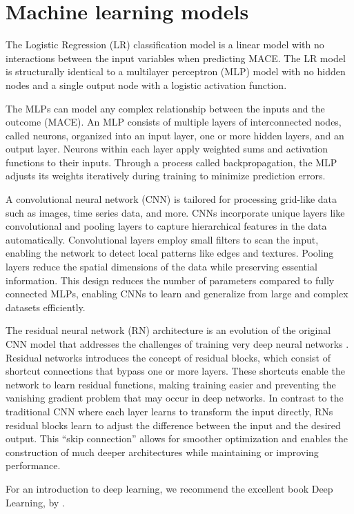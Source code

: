\documentclass[preprint]{elsarticle}
\begin{document}
\section{Machine learning models}
The Logistic Regression (LR) classification model is a linear model with no interactions between the input variables when predicting MACE. The LR model is structurally identical to a multilayer perceptron (MLP) model with no hidden nodes and a single output node with a logistic activation function.

The MLPs can model any complex relationship between the inputs and the outcome (MACE). An MLP consists of multiple layers of interconnected nodes, called neurons, organized into an input layer, one or more hidden layers, and an output layer. Neurons within each layer apply weighted sums and activation functions to their inputs. Through a process called backpropagation, the MLP adjusts its weights iteratively during training to minimize prediction errors.

A convolutional neural network (CNN) is tailored for processing grid-like data such as images, time series data, and more. CNNs incorporate unique layers like convolutional and pooling layers to capture hierarchical features in the data automatically. Convolutional layers employ small filters to scan the input, enabling the network to detect local patterns like edges and textures. Pooling layers reduce the spatial dimensions of the data while preserving essential information. This design reduces the number of parameters compared to fully connected MLPs, enabling CNNs to learn and generalize from large and complex datasets efficiently.

The residual neural network (RN) architecture is an evolution of the original CNN model that addresses the challenges of training very deep neural networks \citep{he2016}. Residual networks introduces the concept of residual blocks, which consist of shortcut connections that bypass one or more layers. These shortcuts enable the network to learn residual functions, making training easier and preventing the vanishing gradient problem that may occur in deep networks. In contrast to the traditional CNN where each layer learns to transform the input directly, RNs residual blocks learn to adjust the difference between the input and the desired output. This ``skip connection'' allows for smoother optimization and enables the construction of much deeper architectures while maintaining or improving performance.

For an introduction to deep learning, we recommend the excellent book Deep Learning, by \citet{goodfellow2016}.
\end{document}
